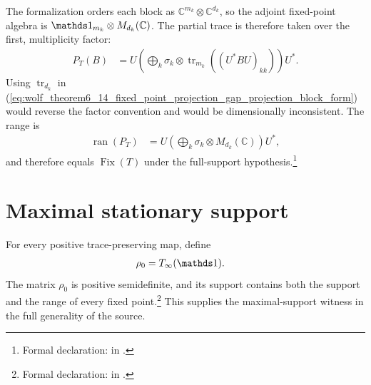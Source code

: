 \documentclass{article}
\begin{document}
The formalization orders each block as
$\mathbb C^{m_k}\otimes\mathbb C^{d_k}$, so the adjoint fixed-point algebra is
$\Id_{m_k}\otimes M_{d_k}(\mathbb C)$. The partial trace is therefore taken
over the first, multiplicity factor:
\begin{align}
  P_T(B)
    &=U\left(\bigoplus_k
      \sigma_k\otimes
      \operatorname{tr}_{m_k}((U^*BU)_{kk})\right)U^*.
  \label{eq:wolf_theorem6_14_fixed_point_projection_gap_projection_block_form}
\end{align}
Using $\operatorname{tr}_{d_k}$ in
(\ref{eq:wolf_theorem6_14_fixed_point_projection_gap_projection_block_form})
would reverse the factor convention and would be dimensionally inconsistent.
The range is
\begin{align}
  \operatorname{ran}(P_T)
    &=U\left(\bigoplus_k
      \sigma_k\otimes M_{d_k}(\mathbb C)\right)U^*,
  \label{eq:wolf_theorem6_14_fixed_point_projection_gap_full_support_range}
\end{align}
and therefore equals $\operatorname{Fix}(T)$ under the full-support
hypothesis.\footnote{Formal declaration:
in
.}

\section{Maximal stationary support}

For every positive trace-preserving map, define
\begin{align}
  \rho_0
    &=T_\infty(\Id).
  \label{eq:wolf_theorem6_14_fixed_point_projection_gap_maximal_support_state}
\end{align}
The matrix $\rho_0$ is positive semidefinite, and its support contains both the
support and the range of every fixed point.\footnote{Formal declaration:
 in
.}
This supplies the maximal-support witness in the full generality of the source.
\end{document}
